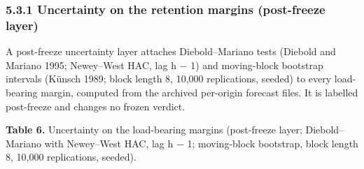 \documentclass[11pt]{article}
\begin{document}
\subsubsection{5.3.1 Uncertainty on the retention margins (post-freeze
layer)}\label{uncertainty-on-the-retention-margins-post-freeze-layer}

A post-freeze uncertainty layer attaches Diebold--Mariano tests (Diebold
and Mariano 1995; Newey--West HAC, lag h − 1) and moving-block bootstrap
intervals (Künsch 1989; block length 8, 10,000 replications, seeded) to
every load-bearing margin, computed from the archived per-origin
forecast files. It is labelled post-freeze and changes no frozen
verdict.

\textbf{Table 6.} Uncertainty on the load-bearing margins (post-freeze
layer; Diebold--Mariano with Newey--West HAC, lag h − 1; moving-block
bootstrap, block length 8, 10,000 replications, seeded).
\end{document}
